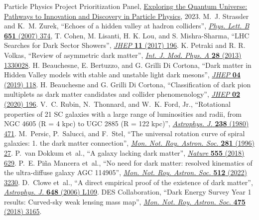 \begin{thebibliography}{99}
 Particle Physics Project Prioritization Panel, \href{https://www.usparticlephysics.org/2023-p5-report/}{Exploring the Quantum Universe: Pathways to Innovation and Discovery in Particle Physics}, 2023.
 M.~J. Strassler and K.~M. Zurek, ``Echoes of a hidden valley at hadron colliders'', \href{http://dx.doi.org/10.1016/j.physletb.2007.06.055}{\textit{Phys. Lett. B} \textbf{651} (2007) 374},
 T. Cohen, M. Lisanti, H. K. Lou, and S. Mishra-Sharma, ``LHC Searches for Dark Sector Showers'', \href{https://doi.org/10.1007/JHEP11(2017)196}{\textit{JHEP} \textbf{11} (2017) 196}.
 K. Petraki and R. R. Volkas, ``Review of asymmetric dark matter'', \href{http://dx.doi.org/10.1142/S0217751X13300287}{\textit{Int. J. Mod. Phys. A} \textbf{28} (2013) 1330028}.
 H. Beauchesne, E. Bertuzzo, and G. Grilli Di Cortona, ``Dark matter in Hidden Valley models with stable and unstable light dark mesons'', \href{https://doi.org/10.1007/JHEP04(2019)118}{\textit{JHEP} \textbf{04} (2019) 118}.
 H. Beauchesne and G. Grilli Di Cortona, ``Classification of dark pion multiplets as dark matter candidates and collider phenomenology'', \href{10.1007/JHEP02(2020)196}{\textit{JHEP} \textbf{02} (2020) 196}.
 V.~C. Rubin, N.~Thonnard, and W.~K. Ford, Jr., ``Rotational properties of 21 SC galaxies with a large range of luminosities and radii, from NGC 4605 (R = 4 kpc) to UGC 2885 (R = 122 kpc)'', \href{http://dx.doi.org/10.1086/158003}{\textit{Astrophys. J.} \textbf{238} (1980) 471}.
 M.~Persic, P.~Salucci, and F.~Stel, ``The universal rotation curve of spiral galaxies: 1. the dark matter connection'', \href{http://dx.doi.org/10.1093/mnras/278.1.27}{\textit{Mon.  Not. Roy. Astron. Soc.} \textbf{281} (1996) 27}.
 P.~van Dokkum et~al., ``A galaxy lacking dark matter'', \href{http://dx.doi.org/10.1038/nature25767}{\textit{Nature} \textbf{555} (2018) 629}.
 P.~E. Pi\~na Mancera et~al., ``No need for dark matter: resolved kinematics of the ultra-diffuse galaxy AGC 114905'', \href{http://dx.doi.org/10.1093/mnras/stab3491}{\textit{Mon. Not. Roy. Astron. Soc.} \textbf{512} (2022) 3230}.
 D.~Clowe et~al., ``A direct empirical proof of the existence of dark matter'', \href{http://dx.doi.org/10.1086/508162}{\textit{Astrophys. J.} \textbf{648} (2006) L109}.
 {DES} Collaboration, ``Dark Energy Survey Year 1 results: Curved-sky weak lensing mass map'', \href{http://dx.doi.org/10.1093/mnras/stx3363}{\textit{Mon. Not. Roy. Astron. Soc.} \textbf{475} (2018) 3165}.

\end{thebibliography}
